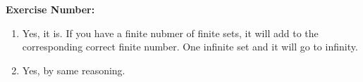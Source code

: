 \documentclass{article}
\begin{document}
\textbf{Exercise Number:   }  %

\medskip 

\noindent 

\begin{enumerate}

\item Yes, it is. If you have a finite nubmer of finite sets, it will add to the corresponding correct finite number. One infinite set and it will go to infinity. 

\item Yes, by same reasoning. 

\end{enumerate}
\end{document}
